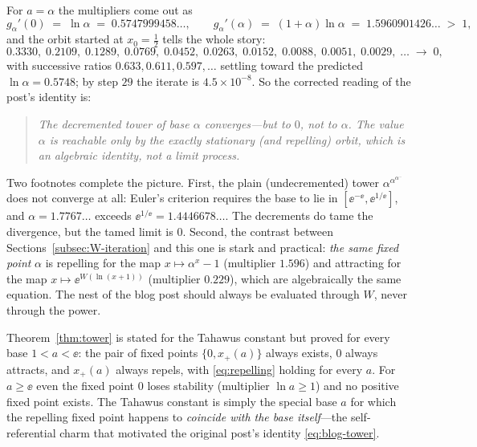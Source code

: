 For $a = \alpha$ the multipliers come out as
\[
    g_{\alpha}'(0) \;=\; \ln\alpha \;=\; 0.5747999458\ldots,
    \qquad
    g_{\alpha}'(\alpha) \;=\; (1+\alpha)\ln\alpha \;=\;
    1.5960901426\ldots \;>\; 1 ,
\]
and the orbit started at $x_{0} = \tfrac12$ tells the whole story:
\[
    0.3330,\; 0.2109,\; 0.1289,\; 0.0769,\; 0.0452,\; 0.0263,\;
    0.0152,\; 0.0088,\; 0.0051,\; 0.0029,\; \ldots \;\to\; 0 ,
\]
with successive ratios $0.633, 0.611, 0.597, \ldots$ settling toward
the predicted $\ln\alpha = 0.5748$; by step $29$ the iterate is
$4.5 \times 10^{-8}$. So the corrected reading of the post's
identity is:

\begin{quote}
\emph{The decremented tower of base $\alpha$ converges---but to
$0$, not to $\alpha$. The value $\alpha$ is reachable only by the
exactly stationary (and repelling) orbit, which is an algebraic
identity, not a limit process.}
\end{quote}

Two footnotes complete the picture. First, the plain (undecremented)
tower $\alpha^{\alpha^{\alpha^{\cdots}}}$ does not converge at all:
Euler's criterion \cite{knoebel} requires the base to lie in
$[\ee^{-\ee}, \ee^{1/\ee}]$, and $\alpha = 1.7767\ldots$ exceeds
$\ee^{1/\ee} = 1.4446678\ldots$. The decrements do tame the
divergence, but the tamed limit is $0$. Second, the contrast between
Sections~\ref{subsec:W-iteration} and this one is stark and
practical: \emph{the same fixed point} $\alpha$ is repelling for the
map $x \mapsto \alpha^{x} - 1$ (multiplier $1.596$) and attracting
for the map $x \mapsto \ee^{W(\ln(x+1))}$ (multiplier $0.229$), which
are algebraically the same equation. The nest of the blog post should
always be evaluated through $W$, never through the power.

\begin{remark}
Theorem~\ref{thm:tower} is stated for the Tahawus constant but proved
for every base $1 < a < \ee$: the pair of fixed points
$\{0, x_{+}(a)\}$ always exists, $0$ always attracts, and
$x_{+}(a)$ always repels, with \eqref{eq:repelling} holding for every
$a$. For $a \ge \ee$ even the fixed point $0$ loses stability
(multiplier $\ln a \ge 1$) and no positive fixed point exists. The
Tahawus constant is simply the special base $a$ for which the
repelling fixed point happens to \emph{coincide with the base
itself}---the self-referential charm that motivated the original
post's identity \eqref{eq:blog-tower}.
\end{remark}
